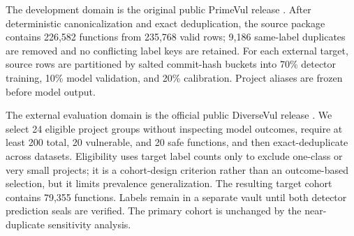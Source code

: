 \documentclass[preprint,12pt]{elsarticle}
\begin{document}
The development domain is the original public PrimeVul release \cite{ding2025primevul}. After deterministic canonicalization and exact deduplication, the source package contains 226,582 functions from 235,768 valid rows; 9,186 same-label duplicates are removed and no conflicting label keys are retained. For each external target, source rows are partitioned by salted commit-hash buckets into 70\% detector training, 10\% model validation, and 20\% calibration. Project aliases are frozen before model output.

The external evaluation domain is the official public DiverseVul release \cite{chen2023diversevul}. We select 24 eligible project groups without inspecting model outcomes, require at least 200 total, 20 vulnerable, and 20 safe functions, and then exact-deduplicate across datasets. Eligibility uses target label counts only to exclude one-class or very small projects; it is a cohort-design criterion rather than an outcome-based selection, but it limits prevalence generalization. The resulting target cohort contains 79,355 functions. Labels remain in a separate vault until both detector prediction seals are verified. The primary cohort is unchanged by the near-duplicate sensitivity analysis.

\begin{table}[t]
\centering
\caption{DiverseVul external project groups. Target rows are exact-deduplicated functions; vulnerability prevalence is reported only descriptively after label release.}
\label{tab:projects}
\small
\setlength{\tabcolsep}{3pt}
%
\end{table}
\end{document}
